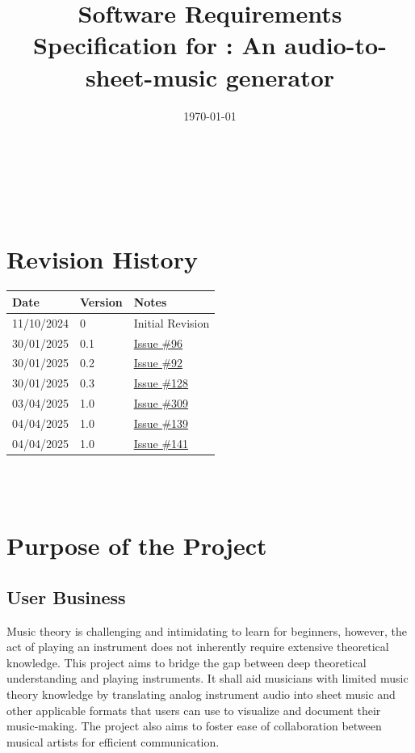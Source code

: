 \documentclass[12pt]{article}
\begin{document}
\title{Software Requirements Specification for \progname: An audio-to-sheet-music generator} 
\author{\authname}
\date{\today}
	
\maketitle
\thispagestyle{empty}

~\newpage


\tableofcontents
\listoffigures
\listoftables

~\newpage

\section*{Revision History}

\begin{tabularx}{\textwidth}{p{3cm}p{2cm}X}
\toprule {\textbf{Date}} & {\textbf{Version}} & {\textbf{Notes}}\\
\midrule
11/10/2024 & 0 & Initial Revision\\
30/01/2025 & 0.1 & \href{https://github.com/emilyperica/ScoreGen/issues/96}{Issue \#96}\\
30/01/2025 & 0.2 & \href{https://github.com/emilyperica/ScoreGen/issues/92}{Issue \#92}\\
30/01/2025 & 0.3 & \href{https://github.com/emilyperica/ScoreGen/issues/128}{Issue \#128}\\
03/04/2025 & 1.0 & \href{https://github.com/emilyperica/ScoreGen/issues/309}{Issue \#309}\\
04/04/2025 & 1.0 & \href{https://github.com/emilyperica/ScoreGen/issues/139}{Issue \#139}\\
04/04/2025 & 1.0 & \href{https://github.com/emilyperica/ScoreGen/issues/141}{Issue \#141}\\
\bottomrule
\end{tabularx}

~\\

~\newpage

\section{Purpose of the Project}
\subsection{User Business}
Music theory is challenging and intimidating to learn for beginners, 
however, the act of playing an instrument does not inherently require 
extensive theoretical knowledge. This project aims to bridge the gap 
between deep theoretical understanding and playing instruments. It 
shall aid musicians with limited music theory knowledge by translating 
analog instrument audio into sheet music and other applicable formats 
that users can use to visualize and document their music-making. The 
project also aims to foster ease of collaboration between musical 
artists for efficient communication. 
\end{document}
